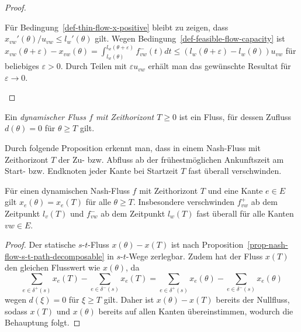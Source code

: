 \begin{proof}
\begin{description}[leftmargin=0cm, topsep=0cm, itemindent=0.5cm]
		Für Bedingung~\ref{def-thin-flow-x-positive} bleibt zu zeigen, dass $x_{vw}'(\theta) /u_{vw}\leq l_w'(\theta)$ gilt.
		Wegen Bedingung~\ref{def-feasible-flow-capacity} ist $x_{vw}(\theta + \varepsilon)-x_{vw}(\theta) = \int_{l_w(\theta)}^{l_w(\theta+\varepsilon)} f_{vw}^-(t) dt\leq (l_w(\theta + \varepsilon) - l_w(\theta)) u_{vw}$ für beliebiges $\varepsilon>0$.
		Durch Teilen mit $\varepsilon u_{vw}$ erhält man das gewünschte Resultat für $\varepsilon\rightarrow 0$.
	\end{description}
\vspace{-1.2 \baselineskip}
\end{proof}

\begin{definition}
	Ein \emph{dynamischer Fluss $f$ mit Zeithorizont $T\geq0$} ist ein Fluss, für dessen Zufluss $d(\theta)= 0$ für $\theta\geq T$ gilt.
\end{definition}

Durch folgende Proposition erkennt man, dass in einem Nash-Fluss mit Zeithorizont $T$ der Zu- bzw. Abfluss ab der frühestmöglichen Ankunftszeit am Start- bzw. Endknoten jeder Kante bei Startzeit $T$ fast überall verschwinden.

\begin{proposition}
Für einen dynamischen Nash-Fluss $f$ mit Zeithorizont $T$ und eine Kante $e\in E$ gilt $x_{e}(\theta) = x_{e}(T)$ für alle $\theta \geq T$.
Insbesondere verschwinden $f_{vw}^+$ ab dem Zeitpunkt $l_v(T)$ und $f_{vw}^-$ ab dem Zeitpunkt $l_w(T)$ fast überall für alle Kanten $vw\in E$.
\end{proposition}
\begin{proof}
	Der statische $s$-$t$-Fluss $x(\theta) -x(T)$ ist nach Proposition~\ref{prop-nash-flow-s-t-path-decomposable} in $s$-$t$-Wege zerlegbar.
	Zudem hat der Fluss $x(T)$ den gleichen Flusswert wie $x(\theta)$, da
	\[ \sum_{e\in \delta^+(s)} x_e(T) - \sum_{e\in\delta^-(s)} x_e(T) = \sum_{e\in \delta^+(s)} x_e(\theta) - \sum_{e\in\delta^-(s)} x_e(\theta)\]
	wegen $d(\xi) = 0$ für $\xi \geq T $ gilt.
	Daher ist $x(\theta)- x(T)$ bereits der Nullfluss, sodass $x(T)$ und $x(\theta)$ bereits auf allen Kanten übereinstimmen, wodurch die Behauptung folgt.
\end{proof}

